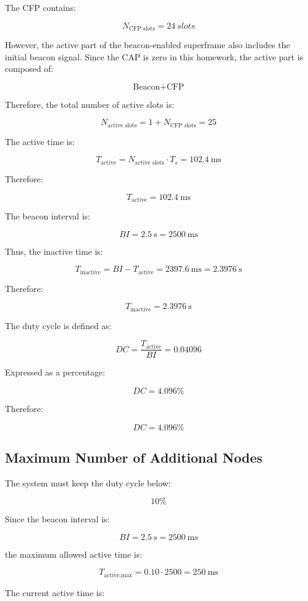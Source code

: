 \documentclass[a4paper,12pt]{article}
\begin{document}
The CFP contains:

\[
N_{\text{CFP slots}} = 24 \ slots
\]


However, the active part of the beacon-enabled superframe also includes the initial beacon signal.
Since the CAP is zero in this homework, the active part is composed of:

\[
\text{Beacon} + \text{CFP}
\]

Therefore, the total number of active slots is:

\[
N_{\text{active slots}} = 1 + N_{\text{CFP slots}} = 25
\]

The active time is:

\[
T_{\text{active}} = N_{\text{active slots}} \cdot T_s = 102.4 \ \text{ms}
\]

Therefore:

\[
\boxed{T_{\text{active}} = 102.4 \ \text{ms}}
\]

The beacon interval is:

\[
BI = 2.5 \ \text{s} = 2500 \ \text{ms}
\]

Thus, the inactive time is:

\[
T_{\text{inactive}} = BI - T_{\text{active}} = 2397.6 \ \text{ms}   = 2.3976 \ \text{s}
\]

Therefore:

\[
\boxed{T_{\text{inactive}} = 2.3976 \ \text{s}}
\]

The duty cycle is defined as:

\[
DC = \frac{T_{\text{active}}}{BI} = 0.04096
\]

Expressed as a percentage:

\[
DC = 4.096\%
\]

Therefore:

\[
\boxed{DC = 4.096\%}
\]

\subsection{Maximum Number of Additional Nodes}

The system must keep the duty cycle below:

\[
10\%
\]

Since the beacon interval is:

\[
BI = 2.5 \ \text{s} = 2500 \ \text{ms}
\]

the maximum allowed active time is:

\[
T_{\text{active,max}} = 0.10 \cdot 2500= 250 \ \text{ms}
\]


The current active time is:
\end{document}
